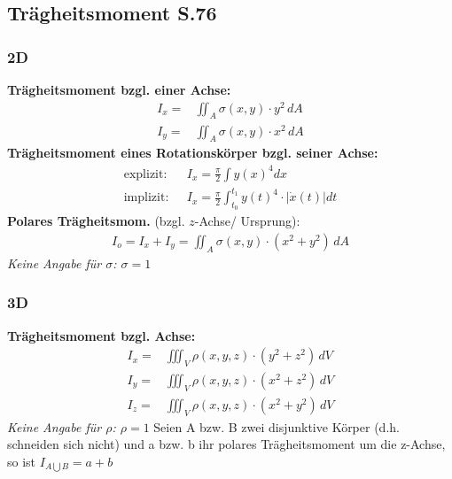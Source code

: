 \subsection{Trägheitsmoment \texorpdfstring{\hfill S.76}{S.76}}
    \subsubsection{2D}
        \textbf{Trägheitsmoment bzgl. einer Achse:}
        \begin{align*}
            I_x =& \iint_A \sigma(x,y) \cdot y^2 \, dA\\
            I_y =& \iint_A \sigma(x,y) \cdot x^2 \, dA
        \end{align*}
        \textbf{Trägheitsmoment eines Rotationskörper bzgl. seiner Achse:}
        \begin{align*}
         \textrm{explizit:} & \hspace{8pt} I_x =\frac{\pi}{2} \int y(x)^4  dx  \\
         \textrm{implizit:} & \hspace{8pt} I_x = \frac{\pi}{2} \int_{t_0}^{t_1} y(t)^4 \cdot |\dot{x}(t)| dt
         \end{align*}
        \textbf{Polares Trägheitsmom.} (bzgl. $z$-Achse/ Ursprung):
        \begin{align*}
            I_o = I_x + I_y = \iint_A \sigma(x,y) \cdot (x^2 + y^2) \, dA 
        \end{align*}
        \textit{Keine Angabe für $\sigma$: $\sigma = 1$}

    \subsubsection{3D}
        \textbf{Trägheitsmoment bzgl. Achse:}
        \begin{align*}
            I_x =& \iiint_V \rho(x,y,z) \cdot (y^2 + z^2) \, dV\\
            I_y =& \iiint_V \rho(x,y,z) \cdot (x^2 + z^2) \, dV \\
            I_z =& \iiint_V \rho(x,y,z) \cdot (x^2 + y^2) \, dV
        \end{align*}
        \textit{Keine Angabe für $\rho$: $\rho = 1$}
        \vskip5pt
    \small{Seien A bzw. B zwei disjunktive Körper (d.h. schneiden sich nicht) und a bzw. b ihr polares Trägheitsmoment um die z-Achse, so ist $I_{A \bigcup B} = a + b$ }
        

